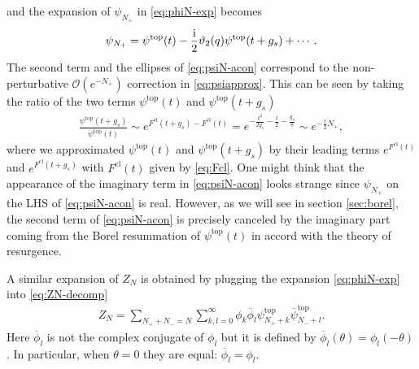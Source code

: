 \documentclass[11pt]{article}
\newcommand{\ri}{{\rm i}}
\def\th{\theta}
\def\b#1{\overline{#1}}
\renewcommand{\[}{\begin{eqnarray}}
\renewcommand{\]}{\end{eqnarray}}
\begin{document}
and the expansion of $\psi_{N_+}$ in \eqref{eq:phiN-exp} becomes
\begin{align}
 \begin{aligned}
  \psi_{N_+}
=\psi^{\text{top}}(t)-\frac{\ri}{2}\vartheta_2(q)\psi^{\text{top}}(t+g_s)+\cdots.
 \end{aligned}
\label{eq:psiN-acon}
\end{align}
The second term and the ellipses of \eqref{eq:psiN-acon}
correspond to the non-perturbative $\mathcal{O}(e^{-N_+})$
correction in \eqref{eq:psiapprox}.
This can be seen by taking the ratio of the two terms
$\psi^{\text{top}}(t)$ and $\psi^{\text{top}}(t+g_s)$
%
\begin{align}
\frac{\psi^{\text{top}}(t+g_s)}{\psi^{\text{top}}(t)}
\sim e^{F^{\text{cl}}(t+g_s)-F^{\text{cl}}(t)}
=e^{-\frac{t^2}{2g_s}-\frac{t}{2}-\frac{g_s}{8}}
\sim e^{-\frac{t}{2}N_+},
\end{align}
where we approximated $\psi^{\text{top}}(t)$ and $\psi^{\text{top}}(t+g_s)$
by their leading terms $e^{F^{\text{cl}}(t)}$ and 
$e^{F^{\text{cl}}(t+g_s)}$ with $F^{\text{cl}}(t)$
given by \eqref{eq:Fcl}.
%
One might think that the appearance of the imaginary term
in \eqref{eq:psiN-acon} looks strange since $\psi_{N_+}$ on the LHS
of \eqref{eq:psiN-acon} is real.
However,
as we will see in section \ref{sec:borel}, 
the second term of \eqref{eq:psiN-acon} is precisely
canceled by the imaginary part coming from the Borel resummation
of $\psi^{\text{top}}(t)$
in accord with the theory of resurgence.

A similar expansion of $Z_N$ is obtained by plugging the expansion 
\eqref{eq:phiN-exp} into \eqref{eq:ZN-decomp}
\begin{align}
 Z_N=
\sum_{N_++N_-=N}\sum_{k,l=0}^\infty
\phi_k\b{\phi}_l
\psi^{\text{top}}_{N_++k}\b{\psi}^{\text{top}}_{N_-+l}.
\label{eq:ZN-psi-exp}
\end{align}
Here $\b{\phi}_l$ is not the complex conjugate of
$\phi_l$ but it is defined by $\b{\phi}_l(\th)=\phi_l(-\th)$.
In particular, when $\th=0$ they are equal: $\b{\phi}_l=\phi_l$.
\end{document}
